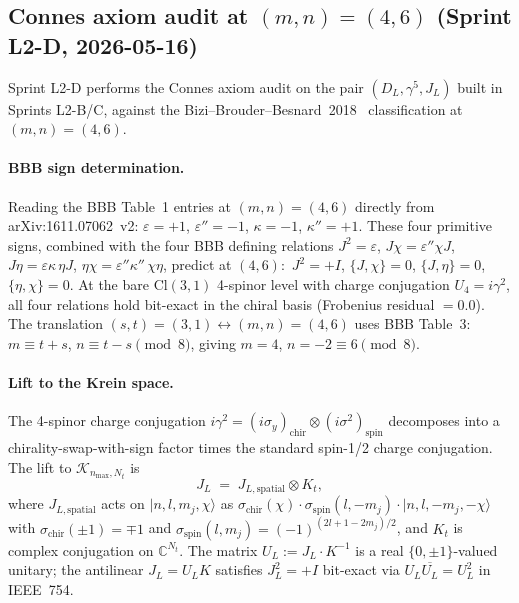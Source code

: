 \documentclass[11pt]{article}
\begin{document}
\subsection{Connes axiom audit at $(m, n) = (4, 6)$
(Sprint L2-D, 2026-05-16)}
\label{sec:l2d_axiom_audit_31}

Sprint L2-D performs the Connes axiom audit on the pair $(D_L,
\gamma^5, J_L)$ built in Sprints L2-B/C, against the
Bizi--Brouder--Besnard~2018~\cite{bizi_brouder_besnard2018}
classification at $(m, n) = (4, 6)$.

\paragraph{BBB sign determination.}
Reading the BBB Table~1 entries at $(m, n) = (4, 6)$ directly from
arXiv:1611.07062~v2:
$\varepsilon = +1$, $\varepsilon'' = -1$, $\kappa = -1$, $\kappa'' = +1$.
These four primitive signs, combined with the four BBB defining
relations $J^2 = \varepsilon$, $J\chi = \varepsilon''\chi J$,
$J\eta = \varepsilon\kappa\,\eta J$, $\eta\chi = \varepsilon''\kappa''\,\chi\eta$,
predict at $(4, 6)$:\ $J^2 = +I$, $\{J, \chi\} = 0$,
$\{J, \eta\} = 0$, $\{\eta, \chi\} = 0$.  At the bare Cl$(3, 1)$
4-spinor level with charge conjugation $U_4 = i\gamma^2$, all four
relations hold bit-exact in the chiral basis (Frobenius residual
$= 0.0$).  The translation $(s, t) = (3, 1) \leftrightarrow (m, n) =
(4, 6)$ uses BBB Table~3:\ $m \equiv t + s$, $n \equiv t - s \pmod 8$,
giving $m = 4$, $n = -2 \equiv 6 \pmod 8$.

\paragraph{Lift to the Krein space.}
The 4-spinor charge conjugation $i\gamma^2 = (i\sigma_y)_{\mathrm{chir}}
\otimes (i\sigma^2)_{\mathrm{spin}}$ decomposes into a chirality-swap-with-sign
factor times the standard spin-1/2 charge conjugation.  The lift to
$\mathcal{K}_{n_{\max}, N_t}$ is
\begin{equation}
\label{eq:l2d_J_lorentzian}
   J_L \;=\; J_{L,\mathrm{spatial}} \otimes K_t,
\end{equation}
where $J_{L,\mathrm{spatial}}$ acts on $|n, l, m_j, \chi\rangle$ as
$\sigma_{\mathrm{chir}}(\chi) \cdot \sigma_{\mathrm{spin}}(l, -m_j)
\cdot |n, l, -m_j, -\chi\rangle$ with
$\sigma_{\mathrm{chir}}(\pm 1) = \mp 1$ and
$\sigma_{\mathrm{spin}}(l, m_j) = (-1)^{(2l + 1 - 2m_j)/2}$, and
$K_t$ is complex conjugation on $\mathbb{C}^{N_t}$.  The matrix
$U_L := J_L \cdot K^{-1}$ is a real $\{0, \pm 1\}$-valued unitary;
the antilinear $J_L = U_L K$ satisfies $J_L^2 = +I$ bit-exact via
$U_L \overline{U_L} = U_L^2$ in IEEE~754.
\end{document}
